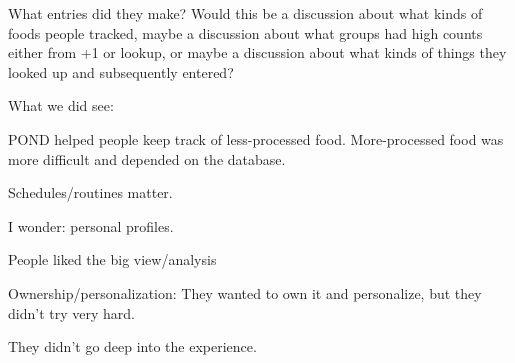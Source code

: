 What entries did they make? Would this be a discussion about what kinds of foods people tracked, maybe a discussion about what groups had high counts either from +1 or lookup, or maybe a discussion about what kinds of things they looked up and subsequently entered? 

What we did see: 
\begin{itemize*}
\item POND helped people keep track of less-processed food. More-processed food was more difficult and depended on the database. 
\item Schedules/routines matter. 
\item I wonder: personal profiles. 
\item People liked the big view/analysis
\item Ownership/personalization: They wanted to own it and personalize, but they didn't try very hard. 
\item They didn't go deep into the experience. 
\end{itemize*}




